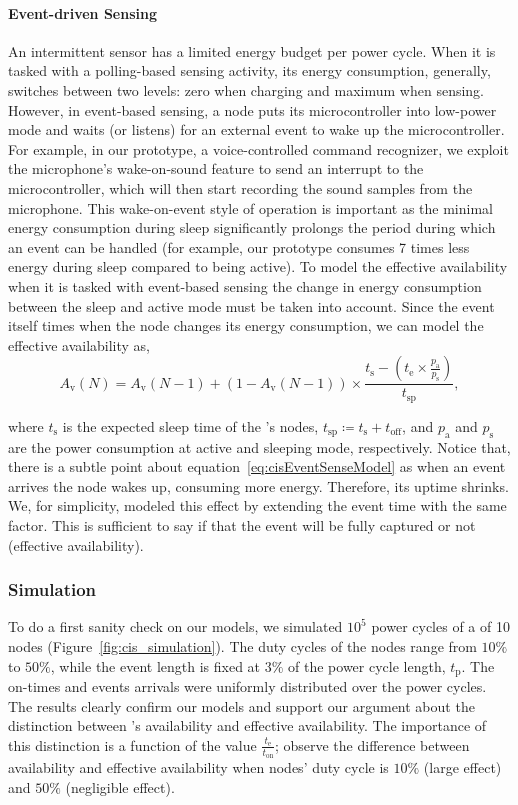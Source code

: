 \paragraph{Event-driven Sensing}
An intermittent sensor has a limited energy budget per power cycle. When it is tasked with a polling-based sensing activity, its energy consumption, generally, switches between two levels: zero when charging and maximum when sensing. However, in event-based sensing, a node puts its microcontroller into low-power mode and waits (or listens) for an external event to wake up the microcontroller. For example, in our prototype, a voice-controlled command recognizer, we exploit the microphone's wake-on-sound feature to send an interrupt to the microcontroller, which will then start recording the sound samples from the microphone. 
This wake-on-event style of operation is important as the minimal energy consumption during sleep significantly prolongs the period during which an event can be handled (for example, our prototype consumes 7 times less energy during sleep compared to being active).
To model the effective \cis availability when it is tasked with event-based sensing the change in energy consumption between the sleep and active mode must be taken into account. Since the event itself times when the node changes its energy consumption, we can model the effective availability as,
\begin{equation}
		A_\text{v}(N) = A_\text{v}(N-1) + \left(1-A_\text{v}(N-1)\right) \times \frac{t_\text{s} - (t_\text{e} \times\frac{p_\text{a}}{p_\text{s}}) }{t_\text{sp}},
		\label{eq:cisEventSenseModel}
\end{equation}

where $t_\text{s}$ is the expected sleep time of the \cis's nodes, 
 $t_\text{sp} \coloneqq t_\text{s} + t_\text{off}$, 
 and $p_\text{a}$ and $p_\text{s}$ are the power consumption at active and sleeping mode, respectively.
 Notice that, there is a subtle point about equation~\ref{eq:cisEventSenseModel} as when an event arrives the node wakes up, consuming more energy. Therefore, its uptime shrinks. We, for simplicity, modeled this effect by extending the event time with the same factor. This is sufficient to say if that the event will be fully captured or not (effective availability).
%
\subsubsection{Simulation}
To do a first sanity check on our models, we simulated $10^5$ power cycles of a \cis of 10 nodes (Figure~\ref{fig:cis_simulation}). The duty cycles of the nodes range from $10\%$ to $50\%$, while the event length is fixed at $3\%$ of the power cycle length, $t_\text{p}$. The on-times and events arrivals were uniformly distributed over the power cycles. 
The results clearly confirm our models and support our argument about the distinction between \cis's availability and effective availability. The importance of this distinction is a function of the value $\frac{t_\text{e}}{t_\text{on}}$; observe the difference between availability and effective availability when nodes' duty cycle is $10\%$ (large effect) and $50\%$ (negligible effect).
%
%
